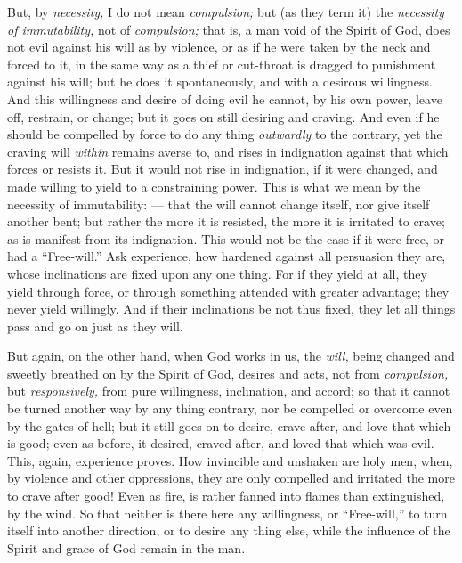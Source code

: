 But, by \emph{necessity, }I do not mean \emph{compulsion; }but (as they term it) the \emph{necessity of immutability, }not of \emph{compulsion; }that is, a man void of the Spirit of God, does not evil against his will as by violence, or as if he were taken by the neck and forced to it, in the same way as a thief or cut-throat is dragged to punishment against his will; but he does it spontaneously, and with a desirous willingness. And this willingness and desire of doing evil he cannot, by his own power, leave off, restrain, or change; but it goes on still desiring and craving. And even if he should be compelled by force to do any thing \emph{outwardly }to the contrary, yet the craving will \emph{within }remains averse to, and rises in indignation against that which forces or resists it. But it would not rise in indignation, if it were changed, and made willing to yield to a constraining power. This is what we mean by the necessity of immutability: — that the will cannot change itself, nor give itself another bent; but rather the more it is resisted, the more it is irritated to crave; as is manifest from its indignation. This would not be the case if it were free, or had a “Free-will.” Ask experience, how hardened against all persuasion they are, whose inclinations are fixed upon any one thing. For if they yield at all, they yield through force, or through something attended with greater advantage; they never yield willingly. And if their inclinations be not thus fixed, they let all things pass and go on just as they will.

But again, on the other hand, when God works in us, the \emph{will, }being changed and sweetly breathed on by the Spirit of God, desires and acts, not from \emph{compulsion, }but \emph{responsively, }from pure willingness, inclination, and accord; so that it cannot be turned another way by any thing contrary, nor be compelled or overcome even by the gates of hell; but it still goes on to desire, crave after, and love that which is good; even as before, it desired, craved after, and loved that which was evil. This, again, experience proves. How invincible and unshaken are holy men, when, by violence and other oppressions, they are only compelled and irritated the more to crave after good! Even as fire, is rather fanned into flames than extinguished, by the wind. So that neither is there here any willingness, or “Free-will,” to turn itself into another direction, or to desire any thing else, while the influence of the Spirit and grace of God remain in the man.

